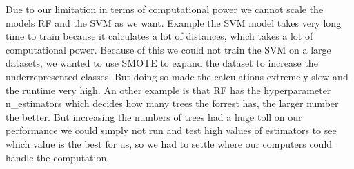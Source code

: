 Due to our limitation in terms of computational power we cannot scale the models RF and the SVM as we want. 
Example the SVM model takes very long time to train because it calculates a lot of distances, which takes a lot of computational power. 
Because of this we could not train the SVM on a large datasets, we wanted to use SMOTE to expand the dataset to increase the underrepresented classes.
But doing so made the calculations extremely slow and the runtime very high. An other example is that RF has the hyperparameter n\_estimators which decides how many trees the forrest has, the larger number the better. 
But increasing the numbers of trees had a huge toll on our performance we could simply not run and test high values of estimators to see which value is the best for us, so we had to settle where our computers could handle the computation.




